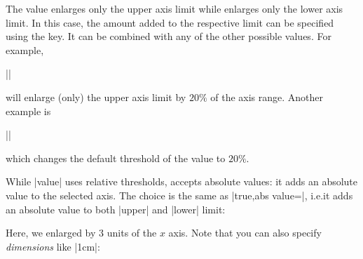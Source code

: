 \begin{pgfplotsxykeylist}
    The value  enlarges only the upper axis limit while
     enlarges only the lower axis limit. In this case, the
    amount added to the respective limit can be specified using the
     key. It can be combined with any of the
    other possible values. For example,

        ||

    will enlarge (only) the upper axis limit by $20\%$ of the axis range.
    Another example is

        ||

    which changes the default threshold of the  value to
    $20\%$.
\begin{codeexample}[]
\end{codeexample}

     While |value| uses relative thresholds,  accepts
     absolute values: it adds an absolute value to the selected axis. The
     choice  is the same as
     |true,abs value=|, i.e.\@ it adds an absolute value to both
     |upper| and |lower| limit:
\begin{codeexample}[]
\end{codeexample}
    \noindent Here, we enlarged by $3$ units of the $x$ axis. Note that you can
    also specify \emph{dimensions} like |1cm|:
\begin{codeexample}[]
\end{codeexample}
\end{pgfplotsxykeylist}
